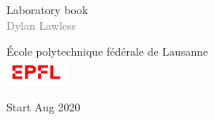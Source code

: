 \begin{titlepage}
\begin{center}

\null\vspace{2cm}
\Large Laboratory book \\[24pt]
{\textcolor{gray}{\normalsize{Dylan Lawless}}}
    
\vfill
	École polytechnique fédérale de Lausanne\\
	\includegraphics[width=2cm]{images/EPFL_Logo_Digital_RGB_PROD}		
\vfill
	
	Start Aug 2020\\

\end{center}
\vspace{2cm}
\end{titlepage}